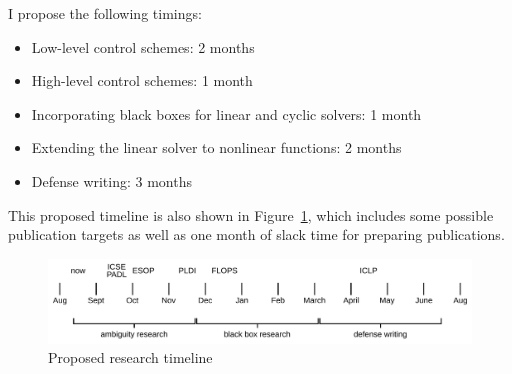 I propose the following timings:
\begin{itemize}
    \item Low-level control schemes: 2 months
    \item High-level control schemes: 1 month
    \item Incorporating black boxes for linear and cyclic solvers: 1 month
    \item Extending the linear solver to nonlinear functions: 2 months
    \item Defense writing: 3 months
\end{itemize}
This proposed timeline is also shown in Figure~\ref{fig:timeline}, which
includes some possible publication targets as well as one month of slack
time for preparing publications.
\begin{figure}
    \centering
    \includegraphics[scale=0.6]{timeline.pdf}
    \caption{Proposed research timeline}
    \label{fig:timeline}
\end{figure}
